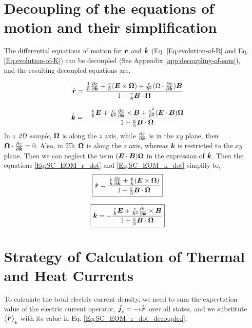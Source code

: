 \documentclass{report}
\renewcommand\vec[1]{\ensuremath\boldsymbol{#1}} %
\begin{document}
\chapter{Decoupling of the equations of motion and their simplification}

The differential equations of motion for $\dot{\vec{r}}$ and $\dot{\vec{k}}$ (Eq. \ref{Eq:evolution-of-R} and Eq. \ref{Eq:evolution-of-K}) can be decoupled (See Appendix \ref{app:decoupling-of-eom}), and the resulting decoupled equations are,

\begin{equation}~\label{Eq:SC_EOM_r_dot}
	\dot{\vec{r}} = \frac{\frac{1}{\hbar} \frac{\partial \varepsilon}{\partial \vec{k}} + \frac{e}{\hbar} (\vec{E}\times\vec{\Omega}) + \frac{e}{\hbar^2} (\Omega \cdot \frac{\partial \varepsilon}{\partial \vec{k}} )\vec{B}}{1 + \frac{e}{\hbar} \vec{B}\cdot\vec{\Omega}}
\end{equation}

\begin{equation}~\label{Eq:SC_EOM_k_dot}
	\dot{\vec{k}} = -\frac{\frac{e}{\hbar} \vec{E} +\frac{e}{\hbar^2} \frac{\partial \varepsilon}{\partial \vec{k}} \times \vec{B} + \frac{e^2}{\hbar^2} (\vec{E}\cdot\vec{B}) \vec{\Omega}}{1 + \frac{e}{\hbar} \vec{B}\cdot\vec{\Omega}}
\end{equation}
In a \textit{2D sample}, $\vec{\Omega}$ is along the $z$ axis, while $\frac{\partial \varepsilon}{\partial \vec{k}}$ is in the $xy$ plane, then $\vec{\Omega} \cdot \frac{\partial \varepsilon}{\partial \vec{k}} = 0$. Also, in 2D, $\vec{\Omega}$ is along the $z$ axis, whereas $\vec{k}$ is restricted to the $xy$ plane. Then we can neglect the term $(\vec{E}\cdot\vec{B}) \vec{\Omega}$ in the expression of $\dot{\vec{k}}$.
Then the equations \eqref{Eq:SC_EOM_r_dot} and \eqref{Eq:SC_EOM_k_dot} simplify to,
\begin{equation}~\label{Eq:SC_EOM_r_dot_decoupled}
	\boxed{\dot{\vec{r}} = \frac{\frac{1}{\hbar} \frac{\partial \varepsilon}{\partial \vec{k}} + \frac{e}{\hbar} (\vec{E}\times\vec{\Omega})}{1 + \frac{e}{\hbar} \vec{B}\cdot\vec{\Omega}}}
\end{equation}

\begin{equation}~\label{Eq:SC_EOM_k_dot_decoupled}
	\boxed{\dot{\vec{k}} = -\frac{\frac{e}{\hbar} \vec{E} +\frac{e}{\hbar^2} \frac{\partial \varepsilon}{\partial \vec{k}} \times \vec{B}}{1 + \frac{e}{\hbar} \vec{B}\cdot\vec{\Omega}}}
\end{equation}
\chapter{Strategy of Calculation of Thermal and Heat Currents}
To calculate the total electric current density, we need to sum the expectation value of the electric current operator, $\hat{\vec{j}_e} = -e \hat{\dot{\vec{r}}}$ over all states, and we substitute $\expval{\hat{\dot{\vec{r}}}}_{_{\vec{k}}}$ with its value in Eq. \eqref{Eq:SC_EOM_r_dot_decoupled}.
\end{document}
